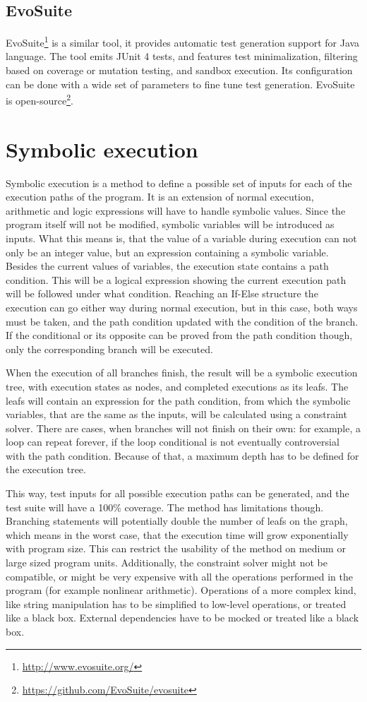 \subsection{EvoSuite}
EvoSuite\footnote{\url{http://www.evosuite.org/}} is a similar tool, it provides automatic test generation support for Java language. The tool emits JUnit 4 tests, and features test minimalization, filtering based on coverage or mutation testing, and sandbox execution. Its configuration can be done with a wide set of parameters to fine tune test generation. EvoSuite is open-source\footnote{\url{https://github.com/EvoSuite/evosuite}}. \cite{aron_autom}
\section{Symbolic execution}

Symbolic execution is a method to define a possible set of inputs for each of the execution paths of the program. It is an extension of normal execution, arithmetic and logic expressions will have to handle symbolic values. Since the program itself will not be modified, symbolic variables will be introduced as inputs. What this means is, that the value of a variable during execution can not only be an integer value, but an expression containing a symbolic variable.
Besides the current values of variables, the execution state contains a path condition. This will be a logical expression showing the current execution path will be followed under what condition. Reaching an If-Else structure the execution can go either way during normal execution, but in this case, both ways must be taken, and the path condition updated with the condition of the branch. If the conditional or its opposite can be proved from the path condition though, only the corresponding branch will be executed. \cite{King:1976:SEP:360248.360252}

When the execution of all branches finish, the result will be a symbolic execution tree, with execution states as nodes, and completed executions as its leafs. The leafs will contain an expression for the path condition, from which the symbolic variables, that are the same as the inputs, will be calculated using a constraint solver. There are cases, when branches will not finish on their own: for example, a loop can repeat forever, if the loop conditional is not eventually controversial with the path condition. Because of that, a maximum depth has to be defined for the execution tree.

This way, test inputs for all possible execution paths can be generated, and the test suite will have a 100\% coverage. The method has limitations though. Branching statements will potentially double the number of leafs on the graph, which means in the worst case, that the execution time will grow exponentially with program size. This can restrict the usability of the method on medium or large sized program units. Additionally, the constraint solver might not be compatible, or might be very expensive with all the operations performed in the program (for example nonlinear arithmetic). \cite{z3_tutorial} Operations of a more complex kind, like string manipulation has to be simplified to low-level operations, or treated like a black box. External dependencies have to be mocked or treated like a black box.
